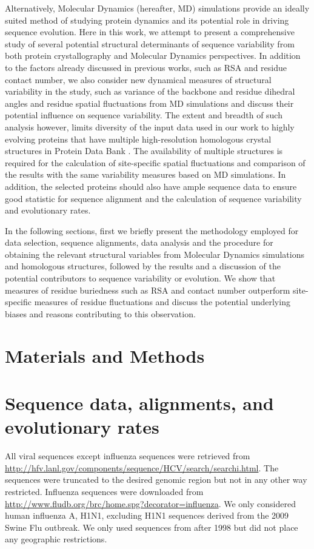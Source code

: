 \documentclass[12pt]{article}
\begin{document}
Alternatively, Molecular Dynamics (hereafter, MD) simulations provide an ideally suited method of studying protein dynamics and its potential role in driving sequence evolution.  Here in this work, we attempt to present a comprehensive study of several potential structural determinants of sequence variability from both protein crystallography and Molecular Dynamics perspectives. In addition to the factors already discussed in previous works, such as RSA and residue contact number, we also consider new dynamical measures of structural variability in the study, such as variance of the backbone and residue dihedral angles and residue spatial fluctuations from MD simulations and discuss their potential influence on sequence variability. The extent and breadth of such analysis however, limits diversity of the input data used in our work to highly evolving proteins that have multiple high-resolution homologous crystal structures in Protein Data Bank \citep{berman_protein_2008}. The availability of multiple structures is required for the calculation of site-specific spatial fluctuations and comparison of the results with the same variability measures based on MD simulations. In addition, the selected proteins should also have ample sequence data to ensure good statistic for sequence alignment and the calculation of sequence variability and evolutionary rates.
	
In the following sections, first we briefly present the methodology employed for data selection, sequence alignments, data analysis and the procedure for obtaining the relevant structural variables from Molecular Dynamics simulations and homologous structures, followed by the results and a discussion of the potential contributors to sequence variability or evolution. We show that measures of residue buriedness such as RSA and contact number outperform site-specific measures of residue fluctuations and discuss the potential underlying biases and reasons contributing to this observation.

\section*{Materials and Methods}

\section*{Sequence data, alignments, and evolutionary rates}

All viral sequences except influenza sequences were retrieved from \url{http://hfv.lanl.gov/components/sequence/HCV/search/searchi.html}.
The sequences were truncated to the desired genomic region but not in any other way restricted. Influenza sequences were downloaded from \url{http://www.fludb.org/brc/home.spg?decorator=influenza}. We only considered human influenza A, H1N1, excluding H1N1 sequences derived from the 2009 Swine Flu outbreak. We only used sequences from after 1998 but did not place any geographic restrictions.
\end{document}
